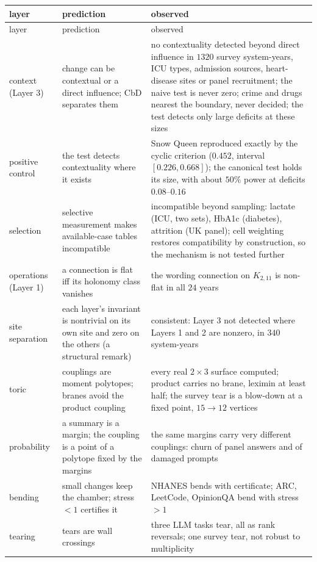 \documentclass[11pt]{article}
\theoremstyle{definition}
\theoremstyle{remark}
\begin{document}
{\small
\begin{longtable}{p{2.3cm}p{6.2cm}p{6.4cm}}
\toprule
layer & prediction & observed\\
\midrule\endfirsthead
\toprule layer & prediction & observed\\\midrule\endhead
\bottomrule\endfoot
context (Layer 3) & change can be contextual or a direct influence; CbD separates them & no contextuality detected beyond direct influence in $1320$ survey system-years, ICU types, admission sources, heart-disease sites or panel recruitment; the naive test is never zero; crime and drugs nearest the boundary, never decided; the test detects only large deficits at these sizes\\
positive control & the test detects contextuality where it exists & Snow Queen reproduced exactly by the cyclic criterion ($0.452$, interval $[0.226,0.668]$); the canonical test holds its size, with about $50\%$ power at deficits $0.08$--$0.16$\\
selection & selective measurement makes available-case tables incompatible & incompatible beyond sampling: lactate (ICU, two sets), HbA1c (diabetes), attrition (UK panel); cell weighting restores compatibility by construction, so the mechanism is not tested further\\
operations (Layer 1) & a connection is flat iff its holonomy class vanishes & the wording connection on $K_{2,11}$ is non-flat in all $24$ years\\
site separation & each layer's invariant is nontrivial on its own site and zero on the others (a structural remark) & consistent: Layer 3 not detected where Layers 1 and 2 are nonzero, in $340$ system-years\\
toric & couplings are moment polytopes; branes avoid the product coupling & every real $2\times3$ surface computed; product carries no brane, leximin at least half; the survey tear is a blow-down at a fixed point, $15\to12$ vertices\\
probability & a summary is a margin; the coupling is a point of a polytope fixed by the margins & the same margins carry very different couplings: churn of panel answers and of damaged prompts\\
bending & small changes keep the chamber; stress $<1$ certifies it & NHANES bends with certificate; ARC, LeetCode, OpinionQA bend with stress $>1$\\
tearing & tears are wall crossings & three LLM tasks tear, all as rank reversals; one survey tear, not robust to multiplicity\\

\end{longtable}}
\end{document}

